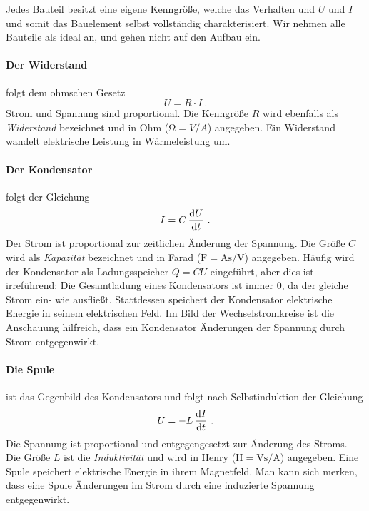 Jedes Bauteil besitzt eine eigene Kenngröße, welche das Verhalten und $U$ und $I$ und somit das Bauelement selbst vollständig charakterisiert. Wir nehmen alle Bauteile als ideal an, und gehen nicht auf den Aufbau ein.
\paragraph*{Der Widerstand} folgt dem ohmschen Gesetz
\begin{equation}\label{eq:R}
    U = R\cdot I ~.
\end{equation}
Strom und Spannung sind proportional. Die Kenngröße $R$ wird ebenfalls als \emph{Widerstand} bezeichnet und in Ohm ($\si{\ohm} = \si{V}/\si{A}$) angegeben. Ein Widerstand wandelt elektrische Leistung in Wärmeleistung um.
\paragraph*{Der Kondensator}
folgt der Gleichung
\begin{equation}\label{eq:C}
    I = C\,\dv{U}{t} ~.
\end{equation}
Der Strom ist proportional zur zeitlichen Änderung der Spannung. Die Größe $C$ wird als \emph{Kapazität} bezeichnet und in Farad ($\si{\farad} = \si{\ampere\second}/\si{\volt}$) angegeben. Häufig wird der Kondensator als Ladungsspeicher $Q = CU$ eingeführt, aber dies ist irreführend: Die Gesamtladung eines Kondensators ist immer 0, da der gleiche Strom ein- wie ausfließt. Stattdessen speichert der Kondensator elektrische Energie in seinem elektrischen Feld. Im Bild der Wechselstromkreise ist die Anschauung hilfreich, dass ein Kondensator Änderungen der Spannung durch Strom entgegenwirkt.
\paragraph*{Die Spule}
ist das Gegenbild des Kondensators und folgt nach Selbstinduktion der Gleichung
\begin{equation}\label{eq:L}
    U = - L\,\dv{I}{t} ~.
\end{equation}
Die Spannung ist proportional und entgegengesetzt zur Änderung des Stroms. Die Größe $L$ ist die \emph{Induktivität} und wird in Henry ($\si{\henry} = \si{\volt\second}/\si{\ampere}$) angegeben. Eine Spule speichert elektrische Energie in ihrem Magnetfeld. Man kann sich merken, dass eine Spule Änderungen im Strom durch eine induzierte Spannung entgegenwirkt.
